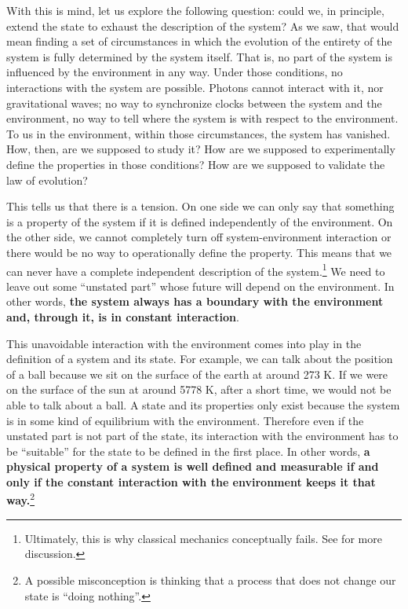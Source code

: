 \documentclass[applsci,article,submit,moreauthors,pdftex]{Definitions/mdpi}
\begin{document}
With this is mind, let us explore the following question: could we, in principle, extend the state to exhaust the description of the system? As we saw, that would mean finding a set of circumstances in which the evolution of the entirety of the system is fully determined by the system itself. That is, no part of the system is influenced by the environment in any way. Under those conditions, no interactions with the system are possible. Photons cannot interact with it, nor gravitational waves; no way to synchronize clocks between the system and the environment, no way to tell where the system is with respect to the environment. To us in the environment, within those circumstances, the system has vanished. How, then, are we supposed to study it? How are we supposed to experimentally define the properties in those conditions? How are we supposed to validate the law of evolution?

This tells us that there is a tension. On one side we can only say that something is a property of the system if it is defined independently of the environment. On the other side, we cannot completely turn off system-environment interaction or there would be no way to operationally define the property. This means that we can never have a complete independent description of the system.\footnote{Ultimately, this is why classical mechanics conceptually fails. See \cite{Carc1} for more discussion.} We need to leave out some ``unstated part'' whose future will depend on the environment. In other words, \textbf{the system always has a boundary with the environment and, through it, is in constant interaction}.

This unavoidable interaction with the environment comes into play in the definition of a system and its state. For example, we can talk about the position of a ball because we sit on the surface of the earth at around 273 K. If we were on the surface of the sun at around 5778 K, after a short time, we would not be able to talk about a ball. A state and its properties only exist because the system is in some kind of equilibrium with the environment. Therefore even if the unstated part is not part of the state, its interaction with the environment has to be ``suitable'' for the state to be defined in the first place. In other words, \textbf{a physical property of a system is well defined and measurable if and only if the constant interaction with the environment keeps it that way.}\footnote{A possible misconception is thinking that a process that does not change our state is ``doing nothing''.}
\end{document}
